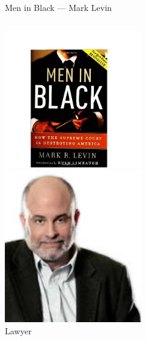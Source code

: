 \documentclass{beamer}
\begin{document}
\begin{frame}{Men in Black --- Mark Levin}
    \begin{columns}[onlytextwidth]
            \centering
            \includegraphics[width=0.75\textwidth]{img/men-in-black.png} \\

            \centering
            \includegraphics[width=0.75\textwidth]{img/mark-levin.png} \\
            Lawyer \\
    \end{columns}
\end{frame}
\end{document}
